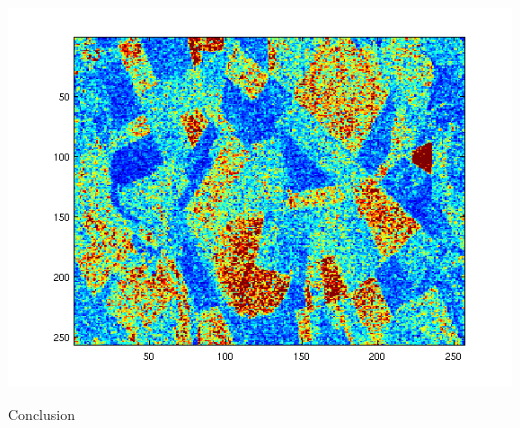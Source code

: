 \documentclass{beamer}
\begin{document}
\begin{frame}
\begin{center}
\includegraphics[scale=0.6]{capture4/partie4_01.png}
\end{center}
\end{frame}

\begin{frame}
\begin{center}
    Conclusion
\end{center}
\end{frame}
\end{document}
